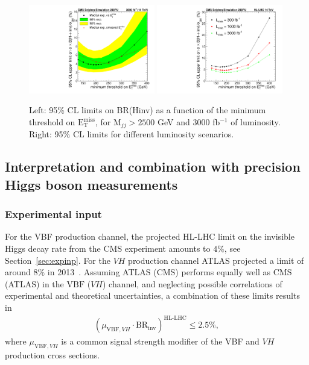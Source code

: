 \documentclass[../report.tex]{subfiles}
\newcommand{\BRHinv}{\mathrm{BR}_\mathrm{inv}}
\newcommand{\MET}{\ensuremath{\mathrm{E}_{\mathrm{T}}^{\mathrm{miss}}}}
\begin{document}
\begin{figure}[htbp]
  \centering
    \includegraphics[width=0.49\textwidth]{1DlimitMET_forPAS_noMHT}
    \hfill
    \includegraphics[width=0.49\textwidth]{1DlimitvsMET_mcScenario4}
\caption{Left: 95\% CL limits on BR(Hinv) as a function of the minimum threshold on \MET, for M$_{jj}>2500$ GeV and 3000 fb$^{-1}$ of luminosity. Right: 95\% CL limits for different luminosity scenarios.}
  \label{fig:1Dlimits}
\end{figure}


\subsection{Interpretation and combination with precision Higgs boson measurements}
\subsubsection{Experimental input}
\label{sec6:exp}
{For the VBF production channel, the projected HL-LHC limit on the invisible Higgs decay rate from the CMS experiment amounts to $4\%$, see Section~\ref{sec:expinp}. For the $VH$ production channel ATLAS projected a limit of around $8\%$ in 2013}~\cite{ATL-PHYS-PUB-2013-014}.
Assuming ATLAS (CMS) performs equally well as CMS (ATLAS) in the $\text{VBF}$ ($VH$) channel, {and neglecting possible correlations of experimental and theoretical uncertainties, a combination of these limits results in}
\begin{align}\label{eq:brinvcombi}
\left(\mu_{\text{VBF},VH} \cdot \BRHinv \right)^\text{HL-LHC} \le 2.5\%,
\end{align}
where $\mu_{\text{VBF},VH}$ is a common signal strength modifier of the VBF and $VH$ production cross sections.
\end{document}
